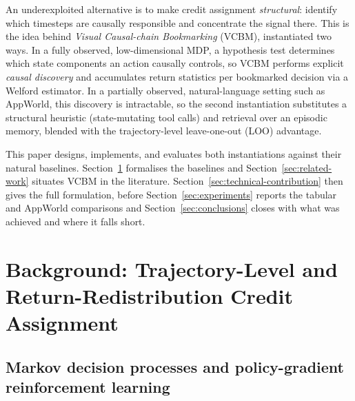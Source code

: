 \documentclass[conference]{IEEEtran}
\begin{document}
An underexploited alternative is to make credit assignment \emph{structural}: identify which timesteps are causally responsible and concentrate the signal there. This is the idea behind \emph{Visual Causal-chain Bookmarking} (VCBM), instantiated two ways. In a fully observed, low-dimensional MDP, a hypothesis test determines which state components an action causally controls, so VCBM performs explicit \emph{causal discovery} and accumulates return statistics per bookmarked decision via a Welford estimator. In a partially observed, natural-language setting such as AppWorld, this discovery is intractable, so the second instantiation substitutes a structural heuristic (state-mutating tool calls) and retrieval over an episodic memory, blended with the trajectory-level leave-one-out (LOO) advantage.

This paper designs, implements, and evaluates both instantiations against their natural baselines. Section~\ref{sec:preliminaries} formalises the baselines and Section~\ref{sec:related-work} situates VCBM in the literature. Section~\ref{sec:technical-contribution} then gives the full formulation, before Section~\ref{sec:experiments} reports the tabular and AppWorld comparisons and Section~\ref{sec:conclusions} closes with what was achieved and where it falls short.

\section{Background: Trajectory-Level and Return-Redistribution Credit Assignment}
\label{sec:preliminaries}

\subsection{Markov decision processes and policy-gradient reinforcement learning}
\label{sec:prelim-mdp}
\end{document}
